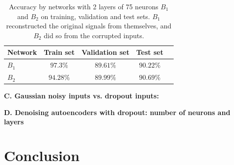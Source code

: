 \documentclass[12pt]{article}
\begin{document}
\begin{table}
\begin{center}
\begin{tabular}{|l||c|c|c|l|}
\hline
Network & Train set & Validation set & Test set\\ \hline \hline
$B_1$ & $97.3\%$ & $89.61\%$ & $90.22\%$\\ \hline
$B_2$ & $94.28\%$ & $89.99\%$ & $90.69\%$\\ \hline
\end{tabular}
\caption{Accuracy by networks with 2 layers of 75 neurons $B_1$ and $B_2$ on training, validation and test sets. $B_1$ reconstructed the original signals from themselves, and $B_2$ did so from the corrupted inputs.}
\label{tab:Accuracy_B1_vs_B2}
\end{center}
\end{table}


\vspace{5mm}
\noindent
\textbf{C. Gaussian noisy inputs vs. dropout inputs:}

\vspace{5mm}
\noindent
\textbf{D. Denoising autoencoders with dropout: number of neurons and layers}


\section{Conclusion}
\noindent



\end{document}
